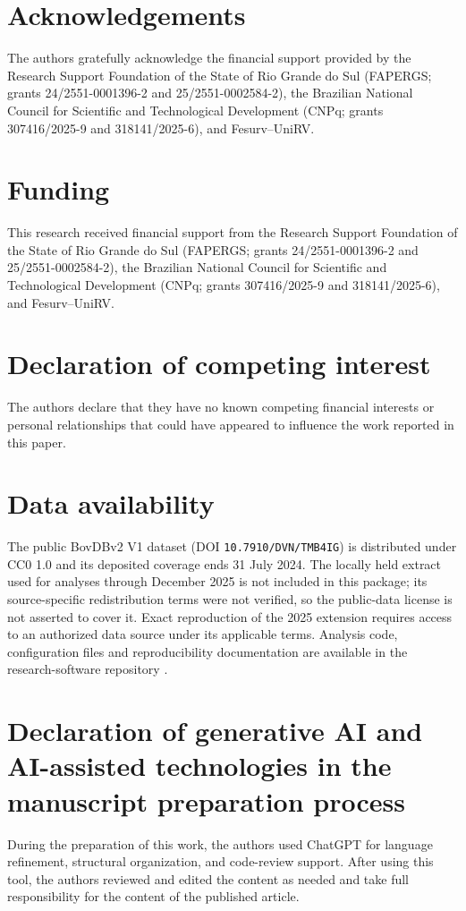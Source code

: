 \section*{Acknowledgements}

The authors gratefully acknowledge the financial support provided by the Research Support Foundation of the State of Rio Grande do Sul (FAPERGS; grants 24/2551-0001396-2 and 25/2551-0002584-2), the Brazilian National Council for Scientific and Technological Development (CNPq; grants 307416/2025-9 and 318141/2025-6), and Fesurv--UniRV.

\section*{Funding}

This research received financial support from the Research Support Foundation of the State of Rio Grande do Sul (FAPERGS; grants 24/2551-0001396-2 and 25/2551-0002584-2), the Brazilian National Council for Scientific and Technological Development (CNPq; grants 307416/2025-9 and 318141/2025-6), and Fesurv--UniRV.

\section*{Declaration of competing interest}

The authors declare that they have no known competing financial interests or personal relationships that could have appeared to influence the work reported in this paper.

\section*{Data availability}

The public BovDBv2 V1 dataset (DOI \texttt{10.7910/DVN/TMB4IG}) is distributed under CC0 1.0 and its deposited coverage ends 31 July 2024. The locally held extract used for analyses through December 2025 is not included in this package; its source-specific redistribution terms were not verified, so the public-data license is not asserted to cover it. Exact reproduction of the 2025 extension requires access to an authorized data source under its applicable terms. Analysis code, configuration files and reproducibility documentation are available in the research-software repository \cite{rmt_planar_networks_2026}.

\section*{Declaration of generative AI and AI-assisted technologies in the manuscript preparation process}

During the preparation of this work, the authors used ChatGPT for language refinement, structural organization, and code-review support. After using this tool, the authors reviewed and edited the content as needed and take full responsibility for the content of the published article.
